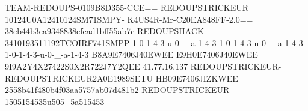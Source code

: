 TEAM-REDOUPS-0109B8D355-CCE==
REDOUPSTRICKEUR 10124U0A12410124SM71SMPY-
K4US4R-Mr-C20EA848FF-2.0==
38cb44b3ea9348838cfead1bff55ab7c
REDOUPSHACK-3410193511192TCOIRF741SMPP
1-0-1-4-3-u-0-_-a-1-4-3
1-0-1-4-3-u-0-_-a-1-4-3
1-0-1-4-3-u-0-_-a-1-4-3
B8A9E7406J40EWEE
E9H0E7406J40EWEE
9I9A2Y4X27422S0X2R722J7Y2QEE
41.77.16.137
REDOUPSTRICKEUR-REDOUPSTRICKEUR2A0E1989SETU
HB09E7406JIZKWEE
2558b41f480b4f03aa5757ab07d481b2
REDOUPSTRICKEUR-1505154535u505_5a515453
